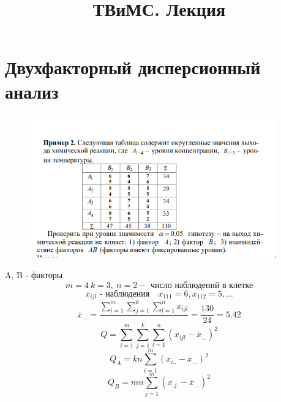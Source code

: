 \documentclass[a4paper]{article}
\begin{document}
\title{ТВиМС. Лекция}
\maketitle

\section*{\centering Двухфакторный дисперсионный анализ}

\begin{figure}[!htp]
    \begin{center}
        \includegraphics[width=0.95\textwidth]{tp-pic1.png}
    \end{center}
\end{figure}

A, B - факторы
\[
    m = 4 \ k = 3, \ n = 2 - \text{ число наблюдений в клетке}
\]
\[
    x_{ijl} \text{ - наблюдения} \quad x_{111} = 6, x_{112} = 5, \dots
\]
\[
    \overline{x}_{\dots} = \frac{\sum_{i=1}^{m}\sum_{j=1}^{k}\sum_{l=1}^{n} x_{ijl} }{} =
    \frac{130}{24} = 5.42
\]
\[
    Q = \sum_{i=1}^{m} \sum_{j=1}^{k} \sum_{l=1}^{n} (x_{ijl} - \overline{x}_{\dots})^2
\]
\[
    Q_{A} = kn \sum_{i=1}^{m} (x_{i..} - \overline{x}_{\dots})^2
\]
\[
    Q_{B} = mn \sum_{j=1}^{m} (x_{.j.} - \overline{x}_{\dots})^2
\]
\end{document}
